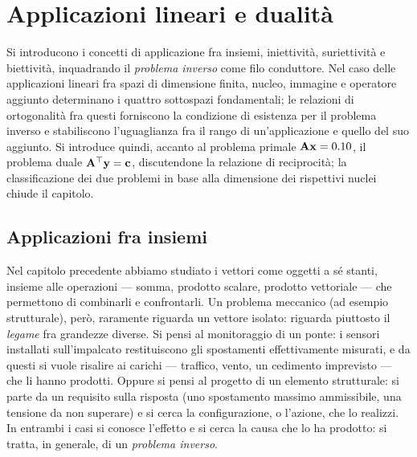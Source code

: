 \graphicspath{{Parti/P01-Preliminari/A03-Applicazioni_Lineari_Dualita/Figure/}}
%	
\chapter{Applicazioni lineari e dualità}\label{app:applicazionilin_dualita}



\begin{sommario}
	
	Si introducono i concetti di applicazione fra insiemi, iniettività, suriettività e biettività, inquadrando il \textit{problema inverso} come filo conduttore. Nel caso delle applicazioni lineari fra spazi di dimensione finita, nucleo, immagine e operatore aggiunto determinano i quattro sottospazi fondamentali; le relazioni di ortogonalità fra questi forniscono la condizione di esistenza per il problema inverso e stabiliscono l'uguaglianza fra il rango di un'applicazione e quello del suo aggiunto. Si introduce quindi, accanto al problema primale $\mathbf{A}\mathbf{x}=0.10$, il problema duale $\mathbf{A}^\top\mathbf{y}=\mathbf{c}$, discutendone la relazione di reciprocità; la classificazione dei due problemi in base alla dimensione dei rispettivi nuclei chiude il capitolo.
\end{sommario}





	\section{Applicazioni fra insiemi}
	
	Nel capitolo precedente abbiamo studiato i vettori come oggetti a sé stanti, insieme alle operazioni --- somma, prodotto scalare, prodotto vettoriale --- che permettono di combinarli e confrontarli. Un problema meccanico (ad esempio strutturale), però, raramente riguarda un vettore isolato: riguarda piuttosto il \textit{legame} fra grandezze diverse. Si pensi al monitoraggio di un ponte: i sensori installati sull'impalcato restituiscono gli spostamenti effettivamente misurati, e da questi si vuole risalire ai carichi --- traffico, vento, un cedimento imprevisto --- che li hanno prodotti. Oppure si pensi al progetto di un elemento strutturale: si parte da un requisito sulla risposta (uno spostamento massimo ammissibile, una tensione da non superare) e si cerca la configurazione, o l'azione, che lo realizzi. In entrambi i casi si conosce l'effetto e si cerca la causa che lo ha prodotto: si tratta, in generale, di un \textit{problema inverso}.
	
